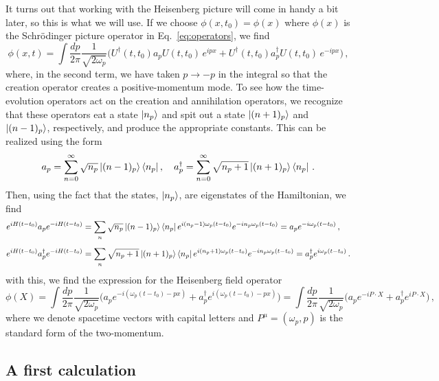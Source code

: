 \documentclass{article}
\numberwithin{equation}{subsection}
\begin{document}
It turns out that working with the Heisenberg picture will come in handy a bit later, so this is what we will use. If we choose $\phi(x, t_0) = \phi(x)$ where 
$\phi(x)$ is the Schr\"odinger picture operator in Eq.~\eqref{eq:operators}, we find
\begin{equation}
    \phi(x,t) = \int\frac{dp}{2\pi}\frac{1}{\sqrt{2\omega_p}}\Big(U^\dag(t, t_0)a_pU(t,t_0)\,e^{ipx} + U^\dag(t, t_0)a_{p}^\dag U(t, t_0)\,e^{-ipx}\Big)\,,
\end{equation}
where, in the second term, we have taken $p\to -p$ in the integral so that the creation operator creates a positive-momentum mode. To see how the time-evolution operators 
act on the creation and annihilation operators, we recognize that these operators eat a state $\ket{n_p}$ and spit out a state $\ket{(n+1)_p}$ 
and $\ket{(n-1)_p}$, respectively, and produce the appropriate constants. This can be realized using the form
\begin{equation}
    a_p = \sum_{n = 0}^\infty\sqrt{n_p}\ket{(n - 1)_p}\bra{n_p}, \quad a_p^\dag = \sum_{n = 0}^\infty\sqrt{n_p + 1}\ket{(n + 1)_p}\bra{n_p}\,.
\end{equation}
Then, using the fact that the states, $\ket{n_p}$, are eigenstates of the Hamiltonian, we find
\begin{equation}
\begin{split}
    &e^{iH(t - t_0)}a_pe^{-iH(t - t_0)} = \sum_n\sqrt{n_p}\ket{(n - 1)_p}\bra{n_p}e^{i(n_p - 1)\omega_p(t - t_0)}e^{-in_p\omega_p(t - t_0)} = a_p e^{-i\omega_p(t - t_0)}\,, \\[0.5em]
    &e^{iH(t - t_0)}a_p^\dag e^{-iH(t - t_0)} = \sum_n\sqrt{n_p+1}\ket{(n + 1)_p}\bra{n_p}e^{i(n_p + 1)\omega_p(t - t_0)}e^{-in_p\omega_p(t - t_0)} = a_p^\dag e^{i\omega_p(t - t_0)}\,.
\end{split}
\end{equation}
with this, we find the expression for the Heisenberg field operator
\begin{equation}
    \phi(X) = \int\frac{dp}{2\pi}\frac{1}{\sqrt{2\omega_p}}\Big(a_p e^{-i(\omega_p (t - t_0) - p x)} + a_p^\dag e^{i(\omega_p(t - t_0) - p x)}\Big) 
	= \int\frac{dp}{2\pi}\frac{1}{\sqrt{2\omega_p}}\Big(a_pe^{-iP\cdot X} + a^\dag_p e^{iP\cdot X}\Big)\,,
\end{equation}
where we denote spacetime vectors with capital letters and $P^\mu = (\omega_p, p)$ is the standard form of the two-momentum.

\subsection{A first calculation}
\end{document}
